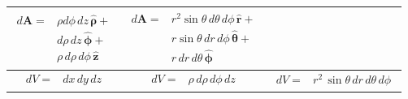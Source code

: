 \documentclass[letterpaper,landscape,10pt]{article}
\begin{document}
{\begin{multicols}{4}
\begin{center}
\begin{minipage}{\columnwidth}
\begin{tabular}{ @{}c@{} !{\color{black}\vline} c !{\color{black}\vline} @{}c@{} }
			\parbox[h][][t]{.295\columnwidth}{
				\begin{equation*}\begin{split}
					d\bm{\bm{A}} =& \rho d\phi\, dz\, \bm{\hat{\rho}} + \\
						&d\rho\, dz\, \bm{\hat{\phi}} + \\
						&\rho\, d\rho\, d\phi\, \bm{\hat{z}}
				\end{split}\end{equation*} } &

			\parbox[h][][t]{.335\columnwidth}{
				\begin{equation*}\begin{split}
					d\bm{\bm{A}} =& r^2\sin\theta \, d\theta \, d\phi \,
							\bm{\hat{r}} + \\
						&r\sin\theta\, dr \, d\phi \, \bm{\hat{\theta}} + \\
						& r \, dr \, d\theta \, \bm{\hat{\phi}}
				\end{split}\end{equation*} } \\

			\hline

			\parbox[h][][t]{.290\columnwidth}{
				\begin{equation*}\begin{split}
					dV =& dx \, dy \, dz
				\end{split}\end{equation*} } &

			\parbox[h][][t]{.295\columnwidth}{
				\begin{equation*}\begin{split}
					dV =& \rho \, d\rho \, d\phi \, dz
				\end{split}\end{equation*} } &

			\parbox[h][][t]{.335\columnwidth}{
				\begin{equation*}\begin{split}
					dV =& r^2 \, \sin\theta \, dr \, d\theta \, d\phi
				\end{split}\end{equation*} } \\
		\end{tabular}\\
	  \end{minipage}
	\end{center}


\end{multicols}}
\end{document}
